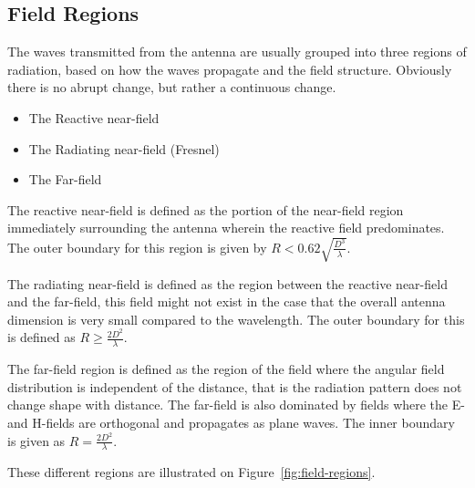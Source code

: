 \subsection{Field Regions}
The waves transmitted from the antenna are usually grouped into three regions of radiation, based on how the waves propagate and the field structure\cite{balanis2012antenna}. Obviously there is no abrupt change, but rather a continuous change. 

\begin{itemize}
\item The Reactive near-field 
\item The Radiating near-field (Fresnel)
\item The Far-field
\end{itemize}

The reactive near-field is defined as the portion of the near-field region immediately surrounding the antenna wherein the reactive field predominates\cite{balanis2012antenna}. The outer boundary for this region is given by $R < 0.62 \sqrt{\frac{D^3}{\lambda}}$\cite{balanis2012antenna}.

The radiating near-field is defined as the region between the reactive near-field and the far-field, this field might not exist in the case that the overall antenna dimension is very small compared to the wavelength. The outer boundary for this is defined as $R \geq \frac{2D^2}{\lambda}$\cite{balanis2012antenna}.

The far-field region is defined as the region of the field where the angular field distribution is independent of the distance, that is the radiation pattern does not change shape with distance. The far-field is also dominated by fields where the E- and H-fields are orthogonal and propagates as plane waves. The inner boundary is given as $R = \frac{2D^2}{\lambda}$\cite{balanis2012antenna}.

These different regions are illustrated on Figure~\ref{fig:field-regions}. 

